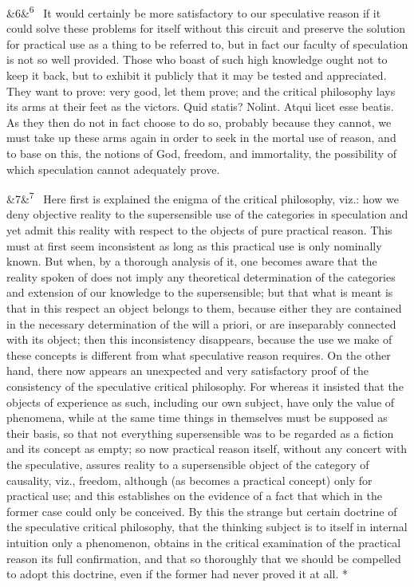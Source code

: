 \documentclass[12pt]{article}
\newcommand{\para}[1][]{\par\noindent\ifx&#1&\else\textsuperscript{\footnotesize #1}~\fi}
\begin{document}
\para[6] It would certainly be more satisfactory to our speculative reason if it could solve these problems for itself without this circuit and preserve the solution for practical use as a thing to be referred to, but in fact our faculty of speculation is not so well provided. Those who boast of such high knowledge ought not to keep it back, but to exhibit it publicly that it may be tested and appreciated. They want to prove: very good, let them prove; and the critical philosophy lays its arms at their feet as the victors. Quid statis? Nolint. Atqui licet esse beatis. As they then do not in fact choose to do so, probably because they cannot, we must take up these arms again in order to seek in the mortal use of reason, and to base on this, the notions of God, freedom, and immortality, the possibility of which speculation cannot adequately prove.

\para[7] Here first is explained the enigma of the critical philosophy, viz.: how we deny objective reality to the supersensible use of the categories in speculation and yet admit this reality with respect to the objects of pure practical reason. This must at first seem inconsistent as long as this practical use is only nominally known. But when, by a thorough analysis of it, one becomes aware that the reality spoken of does not imply any theoretical determination of the categories and extension of our knowledge to the supersensible; but that what is meant is that in this respect an object belongs to them, because either they are contained in the necessary determination of the will a priori, or are inseparably connected with its object; then this inconsistency disappears, because the use we make of these concepts is different from what speculative reason requires. On the other hand, there now appears an unexpected and very satisfactory proof of the consistency of the speculative critical philosophy. For whereas it insisted that the objects of experience as such, including our own subject, have only the value of phenomena, while at the same time things in themselves must be supposed as their basis, so that not everything supersensible was to be regarded as a fiction and its concept as empty; so now practical reason itself, without any concert with the speculative, assures reality to a supersensible object of the category of causality, viz., freedom, although (as becomes a practical concept) only for practical use; and this establishes on the evidence of a fact that which in the former case could only be conceived. By this the strange but certain doctrine of the speculative critical philosophy, that the thinking subject is to itself in internal intuition only a phenomenon, obtains in the critical examination of the practical reason its full confirmation, and that so thoroughly that we should be compelled to adopt this doctrine, even if the former had never proved it at all. *
\end{document}
